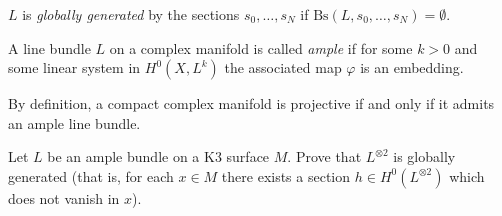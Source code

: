 \begin{definition}
\label{definition-globally-generated}
\begin{reference}
\cite[p. 86]{huc}
\end{reference}
$L$ is {\it globally generated} by the sections $s_0,\ldots,s_N$ if
$\text{Bs}(L,s_0,\ldots,s_N)=\emptyset$.
\end{definition}

\begin{definition}
\label{definition-ample}
\begin{reference}
\cite[Definition 2.3.28]{huc}
\end{reference}
A line bundle $L$ on a complex manifold is called {\it ample} if for some $k>0$
and some linear system in $H^{0}(X,L^k)$ the associated map $\varphi$ is an
embedding.
\end{definition}

\begin{slogan}
By definition, a compact complex manifold is projective if and only if it admits
an ample line bundle.
\end{slogan}

\begin{exercise}
\label{exercise-L-ample-implies-Lotimes2-globally-generated}
Let $L$ be an ample bundle on a K3 surface $M$. Prove that $L^{\otimes 2}$ is
globally generated (that is, for each $x \in M$ there exists a section $h \in
H^{0}(L^{\otimes 2})$ which does not vanish in $x$).
\end{exercise}

